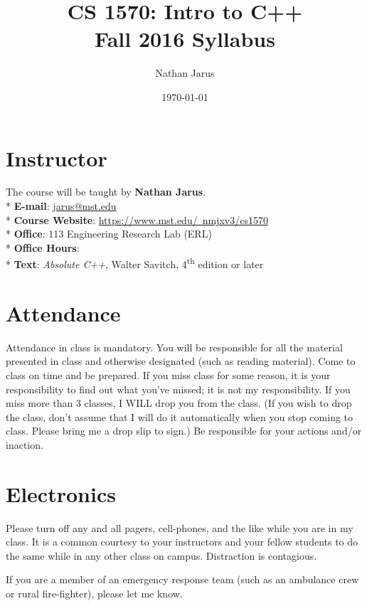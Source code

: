 \documentclass{article}
\title{CS 1570: Intro to C++ \\ Fall 2016 Syllabus}
\date{\today}
\author{Nathan Jarus}
\begin{document}
\maketitle

\section{Instructor}
The course will be taught by \textbf{Nathan Jarus}. \\*
\textbf{E-mail}: \href{mailto:jarus@mst.edu}{jarus@mst.edu} \\*
\textbf{Course Website}: \href{https://www.mst.edu/~nmjxv3/cs1570}{https://www.mst.edu/~nmjxv3/cs1570} \\*
\textbf{Office}: 113 Engineering Research Lab (ERL) \\* %
\textbf{Office Hours}: \\*
\textbf{Text}: \textit{Absolute C++}, Walter Savitch, 4\textsuperscript{th} edition or later\\

\section{Attendance}
Attendance in class is mandatory.
You will be responsible for all the material presented in class and otherwise designated (such as reading material).
Come to class on time and be prepared.
If you miss class for some reason, it is your responsibility to find out what you've missed; it is not my responsibility.
If you miss more than 3 classes, I WILL drop you from the class.
(If you wish to drop the class, don't assume that I will do it automatically when you stop coming to class. Please bring me a drop slip to sign.)
Be responsible for your actions and/or inaction.

\section{Electronics}
Please turn off any and all pagers, cell-phones, and the like while you are in my class.
It is a common courtesy to your instructors and your fellow students to do the same while in any other class on campus.
Distraction is contagious.

If you are a member of an emergency response team (such as an ambulance crew or rural fire-fighter), please let me know.
\end{document}
